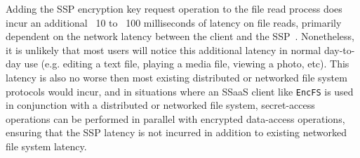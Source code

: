 Adding the SSP encryption key request operation to the file read
process does incur an additional ~10 to ~100 milliseconds of latency
on file reads, primarily dependent on the network latency between the
client and the SSP~\cite{custos-trios}. Nonetheless, it is unlikely
that most users will notice this additional latency in normal
day-to-day use (e.g. editing a text file, playing a media file,
viewing a photo, etc). This latency is also no worse then most
existing distributed or networked file system protocols would incur,
and in situations where an SSaaS client like \texttt{EncFS} is used in
conjunction with a distributed or networked file system, secret-access
operations can be performed in parallel with encrypted data-access
operations, ensuring that the SSP latency is not incurred in addition
to existing networked file system latency.

